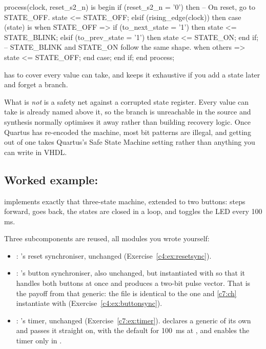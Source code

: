 \begin{vhdlcode}
process(clock, reset_s2_n) is
begin
    if (reset_s2_n = '0') then
        -- On reset, go to STATE_OFF.
        state <= STATE_OFF;
    elsif (rising_edge(clock)) then
        case (state) is
            when STATE_OFF =>
                if (to_next_state = '1') then
                    state <= STATE_BLINK;
                elsif (to_prev_state = '1') then
                    state <= STATE_ON;
                end if;
            -- STATE_BLINK and STATE_ON follow the same shape.
            when others =>
                state <= STATE_OFF;
        end case;
    end if;
end process;
\end{vhdlcode}

 has to cover every value  can take, and
 keeps it exhaustive if you add a state later and forget a branch.

What  is \emph{not} is a safety net against a corrupted state register. Every
value  can take is already named above it, so the branch is unreachable in the source
and synthesis normally optimises it away rather than building recovery logic. Once Quartus has
re-encoded the machine, most bit patterns are illegal, and getting out of one takes Quartus's Safe
State Machine setting rather than anything you can write in VHDL.

\subsection*{Worked example: }
 implements exactly that three-state machine, extended to two buttons:
 steps forward,  goes back, the states are closed in a loop, and
 toggles the LED every 100 ms.

Three subcomponents are reused, all modules you wrote yourself:
\begin{itemize}
  \item {}: 's reset synchroniser, unchanged
    (Exercise~\ref{c4:ex:resetsync}).
  \item {}: 's button synchroniser, also unchanged, but instantiated
    with  so that it handles both buttons at once and produces a two-bit pulse
    vector. That is the payoff from that generic: the file is identical to the one 
    and \ref{c7:ch} instantiate with  (Exercise~\ref{c4:ex:buttonsync}).
  \item {}: 's timer, unchanged (Exercise~\ref{c7:ex:timer}).
     declares a generic  of its own and passes it straight on,
    with the default  for 100~ms at , and enables the timer only in
    .
\end{itemize}

